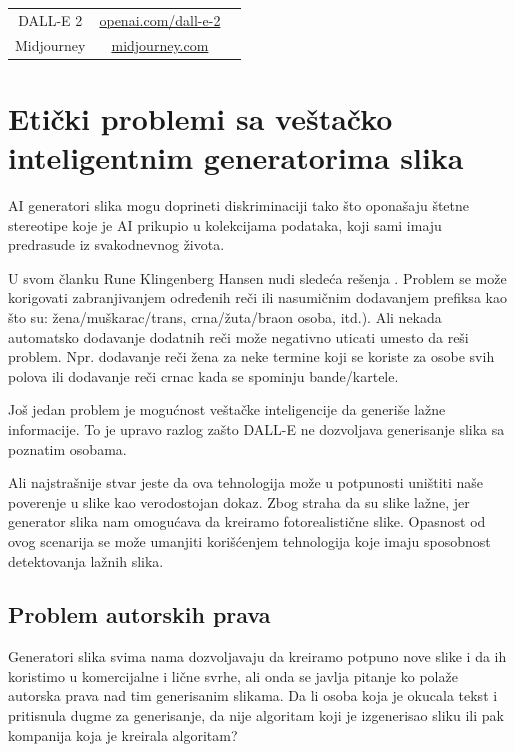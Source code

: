 \documentclass[12pt, letterpaper]{article}
\begin{document}
\begin{center}
\begin{tabular}{ |c|c|c| } 
 \hline
 DALL-E 2 & \href{https://openai.com/dall-e-2/}{openai.com/dall-e-2} \\
 Midjourney & \href{https://www.midjourney.com/}{midjourney.com} \\
 \hline
\end{tabular}
\end{center}

\section{Etički problemi sa veštačko inteligentnim generatorima slika}

AI generatori slika mogu doprineti diskriminaciji tako što oponašaju štetne stereotipe koje je AI prikupio u kolekcijama podataka, koji sami imaju predrasude iz svakodnevnog života.

U svom članku Rune Klingenberg Hansen nudi sledeća rešenja \cite{kljuc1}. Problem se može korigovati zabranjivanjem određenih reči ili nasumičnim dodavanjem prefiksa kao što su: žena/muškarac/trans, crna/žuta/braon osoba, itd.). Ali nekada automatsko dodavanje dodatnih reči može negativno uticati umesto da reši problem. Npr. dodavanje reči žena za neke termine koji se koriste za osobe svih polova ili dodavanje reči crnac kada se spominju bande/kartele.

Još jedan problem je mogućnost veštačke inteligencije da generiše lažne informacije. To je upravo razlog zašto DALL-E \cite{poznate} ne dozvoljava generisanje slika sa poznatim osobama.

Ali najstrašnije stvar jeste da ova tehnologija može u potpunosti uništiti naše poverenje u slike kao verodostojan dokaz. Zbog straha da su slike lažne, jer generator slika nam omogućava da kreiramo fotorealistične slike. Opasnost od ovog scenarija se može umanjiti korišćenjem tehnologija koje imaju sposobnost detektovanja lažnih slika.



\subsection{Problem autorskih prava}

Generatori slika svima nama dozvoljavaju da kreiramo potpuno nove slike i da ih koristimo u komercijalne i lične svrhe, ali onda se javlja pitanje ko polaže autorska prava nad tim generisanim slikama. Da li osoba koja je okucala tekst i pritisnula dugme za generisanje, da nije algoritam koji je izgenerisao sliku ili pak kompanija koja je kreirala algoritam?
\end{document}
